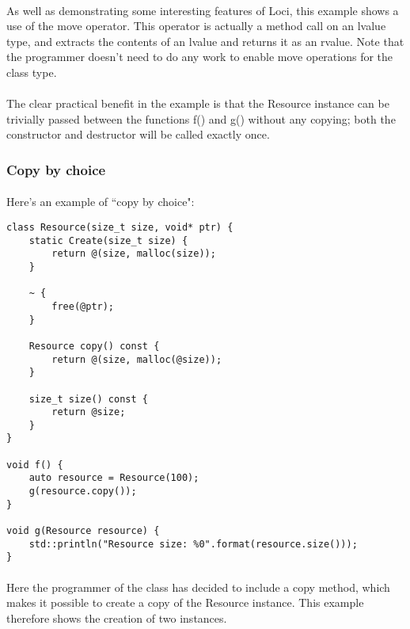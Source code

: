 \documentclass[12pt,twoside,notitlepage]{report}
\begin{document}
\paragraph{}
As well as demonstrating some interesting features of Loci, this example shows a use of the move operator. This operator is actually a method call on an lvalue type, and extracts the contents of an lvalue and returns it as an rvalue. Note that the programmer doesn’t need to do any work to enable move operations for the class type.

\paragraph{}
The clear practical benefit in the example is that the Resource instance can be trivially passed between the functions f() and g() without any copying; both the constructor and destructor will be called exactly once.

\subsubsection{Copy by choice}

\paragraph{}
Here’s an example of ``copy by choice":

\begin{lstlisting}
class Resource(size_t size, void* ptr) {
	static Create(size_t size) {
		return @(size, malloc(size));
	}
	
	~ {
		free(@ptr);
	}
	
	Resource copy() const {
		return @(size, malloc(@size));
	}
	
	size_t size() const {
		return @size;
	}
}

void f() {
	auto resource = Resource(100);
	g(resource.copy());
}

void g(Resource resource) {
	std::println("Resource size: %0".format(resource.size()));
}
\end{lstlisting}

\paragraph{}
Here the programmer of the class has decided to include a copy method, which makes it possible to create a copy of the Resource instance. This example therefore shows the creation of two instances.
\end{document}
